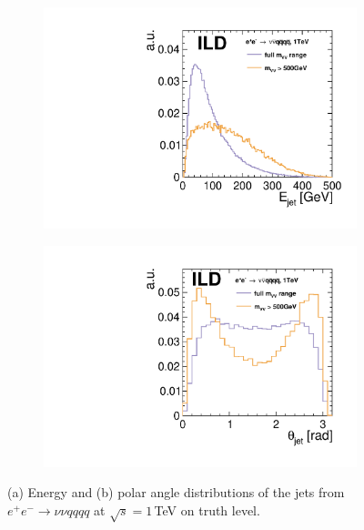 \begin{figure}[htbp]
\begin{subfigure}{0.49\textwidth} \includegraphics[width=\textwidth]{Performance/fig/comp_jet_E.pdf}
 \caption{ \label{fig:qgc:truejet:E}}
 \end{subfigure}
\begin{subfigure}{0.49\textwidth} \includegraphics[width=\textwidth]{Performance/fig/comp_jet_theta.pdf}
 \caption{  \label{fig:qgc:truejet:theta}}
 \end{subfigure}
\caption{(a) Energy and (b) polar angle distributions of the jets from $e^+e^- \to \nu\nu qqqq$ at $\sqrt{s}=1$\,TeV on truth level.
}
\label{fig:qgc:truejet}
\end{figure}

